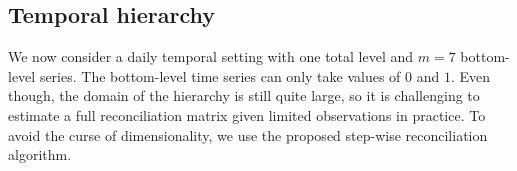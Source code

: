 \documentclass[a4paper,review,12pt,authoryear]{elsarticle}
\let\code=\texttt
\let\proglang=\textsf
\begin{document}
\subsection{Temporal hierarchy}

We now consider a daily temporal setting with one total level and $m=7$ bottom-level series. The bottom-level time series can only take values of $0$ and $1$. 
Even though, the domain of the hierarchy is still quite large, so it is challenging to estimate a full reconciliation matrix given limited observations in practice. 
To avoid the curse of dimensionality, we use the proposed step-wise reconciliation algorithm. 





\end{document}
